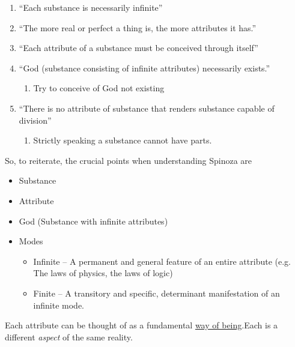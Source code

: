 \documentclass{article}
\begin{document}
\begin{spacing}{1.2}
\begin{enumerate}
\begin{enumerate}
                \item Substances must be self-caused
                \\Therefore
                \item At least one substance must exist (Definition 1)
            \end{enumerate}
            \item ``Each substance is necessarily infinite''
            \item ``The more real or perfect a thing is, the more attributes it has.''
            \item ``Each attribute of a substance must be conceived through itself''
            \item ``God (substance consisting of infinite attributes) necessarily exists.''
            \begin{enumerate}
                \item Try to conceive of God not existing
            \end{enumerate}
            \item ``There is no attribute of substance that renders substance capable of division''
            \begin{enumerate}
                \item Strictly speaking a substance cannot have parts.
            \end{enumerate}
        \end{enumerate}

        So, to reiterate, the crucial points when understanding Spinoza are
        \begin{itemize}
            \item Substance
            \item Attribute
            \item God (Substance with infinite attributes)
            \item Modes
            \begin{itemize}
                \item Infinite -- A permanent and general feature of an entire attribute (e.g. The laws of physics, the laws of logic)
                \item Finite -- A transitory and specific, determinant manifestation of an infinite mode.
            \end{itemize}
        \end{itemize}
        Each attribute can be thought of as a fundamental \underline{way of being}.Each is a different \emph{aspect} of the same reality.

\end{spacing}
\end{document}
